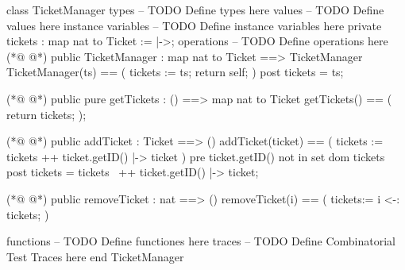 \begin{vdmpp}[breaklines=true]
class TicketManager
types
-- TODO Define types here
values
-- TODO Define values here
instance variables
-- TODO Define instance variables here
 private tickets : map nat to Ticket := {|->};
operations
-- TODO Define operations here
(*@
\label{TicketManager:11}
@*)
 public TicketManager : map nat to Ticket ==> TicketManager
  TicketManager(ts) == (
   tickets := ts;
   return self;
  )
 post tickets = ts;
  
(*@
\label{getTickets:18}
@*)
 public pure getTickets : () ==> map nat to Ticket
 getTickets() == (
  return tickets;
 );
 
(*@
\label{addTicket:23}
@*)
 public addTicket : Ticket ==> ()
 addTicket(ticket) == (
  tickets := tickets ++ {ticket.getID() |-> ticket}
 )
 pre ticket.getID() not in set dom tickets
 post tickets = tickets~ ++ {ticket.getID() |-> ticket};
 
(*@
\label{removeTicket:30}
@*)
 public removeTicket : nat ==> ()
 removeTicket(i) == (
  tickets:= {i} <-: tickets; 
 )
 
functions
-- TODO Define functiones here
traces
-- TODO Define Combinatorial Test Traces here
end TicketManager
\end{vdmpp}
